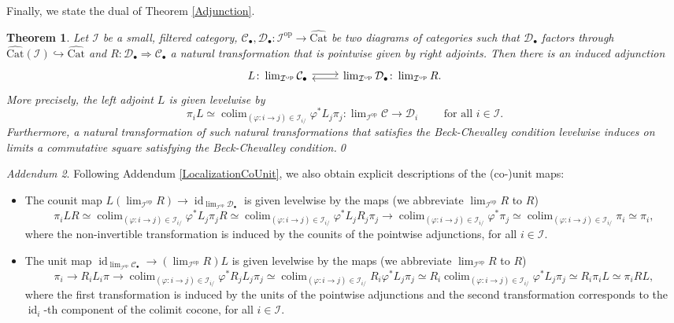 \documentclass[a4paper,reqno,10pt]{amsart}
\newtheorem{theorem}{Theorem}[section]
\theoremstyle{definition}
\theoremstyle{remark}
\newtheorem{addendum}[theorem]{Addendum}
\newcommand{\br}[1]{\left(#1\right)}
\newcommand{\C}{\mathcal{C}}
\newcommand{\D}{\mathcal{D}}
\newcommand{\I}{\mathcal{I}}
\DeclareMathOperator*{\colim}{colim}
\newcommand{\id}{\operatorname{id}}
\newcommand{\Cat}{\mathrm{Cat}}
\newcommand{\op}{\mathrm{op}}
\newcommand{\Adj}{\arrow[r,shift left=0.2em]\arrow[r,leftarrow,shift right=0.2em]}
\begin{document}
Finally, we state the dual of Theorem \ref{Adjunction}.
\begin{theorem}\label{AdjunctionDual}
Let $\I$ be a small, filtered category, $\C_{\bullet},\D_{\bullet}\colon\I^{\op}\rightarrow\widehat{\Cat}$ be two diagrams of categories such that $\D_{\bullet}$ factors through $\widehat{\Cat}\br{\I}\hookrightarrow\widehat{\Cat}$ and $R\colon\D_{\bullet}\Rightarrow\C_{\bullet}$ a natural transformation that is pointwise given by right adjoints. Then there is an induced adjunction
\begin{equation*}
\begin{tikzcd}
L\colon\lim_{\I^{\op}}\C_{\bullet}\Adj & \lim_{\I^{\op}}\D_{\bullet}\colon\lim_{\I^{\op}}R.
\end{tikzcd}
\end{equation*}
More precisely, the left adjoint $L$ is given levelwise by
\begin{equation*}
\pi_iL\simeq\colim_{(\varphi\colon i\rightarrow j)\in\I_{i/}}\varphi^{\ast}L_j\pi_j\colon\lim\nolimits_{\I^{\op}}\C\rightarrow\D_i\qquad\text{ for all }i\in\I.
\end{equation*}
Furthermore, a natural transformation of such natural transformations that satisfies the Beck-Chevalley condition levelwise induces on limits a commutative square satisfying the Beck-Chevalley condition.\qed
\end{theorem}
\begin{addendum}\label{AdjunctionCoUnit}
Following Addendum \ref{LocalizationCoUnit}, we also obtain explicit descriptions of the (co-)unit maps:
\begin{itemize}[leftmargin=*]
\item The counit map $L(\lim_{\I^{\op}}R)\rightarrow\id_{\lim_{\I^{\op}}\D_{\bullet}}$ is given levelwise by the maps (we abbreviate $\lim_{\I^{\op}}R$ to $R$)
\begin{equation*}
\pi_iLR\simeq\colim_{(\varphi\colon i\rightarrow j)\in\I_{i/}}\varphi^{\ast}L_j\pi_jR\simeq\colim_{(\varphi\colon i\rightarrow j)\in\I_{i/}}\varphi^{\ast}L_jR_j\pi_j\rightarrow\colim_{(\varphi\colon i\rightarrow j)\in\I_{i/}}\varphi^{\ast}\pi_j\simeq\colim_{(\varphi\colon i\rightarrow j)\in\I_{i/}}\pi_i\simeq\pi_i,
\end{equation*}
where the non-invertible transformation is induced by the counits of the pointwise adjunctions, for all $i\in\I$.
\item The unit map $\id_{\lim_{\I^{\op}}\C_{\bullet}}\rightarrow(\lim_{\I^{\op}}R)L$ is given levelwise by the maps (we abbreviate $\lim_{\I^{\op}}R$ to $R$)
\begin{equation*}
\pi_i\rightarrow R_iL_i\pi\rightarrow\colim_{(\varphi\colon i\rightarrow j)\in\I_{i/}}\varphi^{\ast}R_jL_j\pi_j\simeq\colim_{(\varphi\colon i\rightarrow j)\in\I_{i/}}R_i\varphi^{\ast}L_j\pi_j\simeq R_i\colim_{(\varphi\colon i\rightarrow j)\in\I_{i/}}\varphi^{\ast}L_j\pi_j\simeq R_i\pi_iL\simeq\pi_iRL,
\end{equation*}
where the first transformation is induced by the units of the pointwise adjunctions and the second transformation corresponds to the $\id_i$-th component of the colimit cocone, for all $i\in\I$.
\end{itemize}
\end{addendum}
\end{document}

